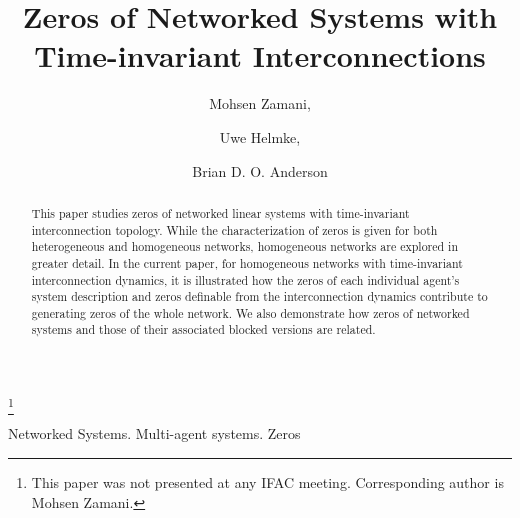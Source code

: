 \documentclass[twocolumn]{autart}    \usepackage{amsmath}
\begin{document}
\begin{frontmatter}


\title{Zeros of Networked Systems with Time-invariant  Interconnections} 

\thanks[footnoteinfo]{This paper was not presented at any IFAC
meeting. Corresponding author is Mohsen Zamani.}











\author[label1]{Mohsen Zamani,}
\author[label2]{Uwe Helmke,}
\author[label3]{Brian D. O. Anderson}
\address[label1]{Research School of Engineering, Australian National University, Canberra, ACT 0200, Australia. (e-mail: mohsen.zamani@anu.edu.au)}
\address[label2]{Institute of Mathematics, University of W\"{u}rzburg, 97074 W\"{u}rzburg, Germany (email: helmke@mathematik.uni-wuerzburg.de)}
\address[label3]{ Research School of Engineering, Australian National University, Canberra, ACT 0200, Australia and Canberra Research Laboratory, National ICT Australia Ltd., PO Box 8001, Canberra, ACT 2601, Australia. (e-mail:
brian.anderson@anu.edu.au) }



\begin{keyword}                           Networked Systems. Multi-agent systems. Zeros               \end{keyword}                             



\begin{abstract}
This paper studies zeros of networked linear systems with time-invariant interconnection  topology. While  the  characterization of zeros is given for both heterogeneous and homogeneous networks,   homogeneous networks are explored in greater detail. In the current paper, for homogeneous networks with time-invariant interconnection dynamics,  it is   illustrated how the zeros of each individual agent's system description
and zeros definable from the interconnection dynamics contribute to generating zeros of the whole network.  We also demonstrate how zeros of  networked systems and those of their  associated blocked versions are related.
\end{abstract}

\end{frontmatter}
\end{document}
